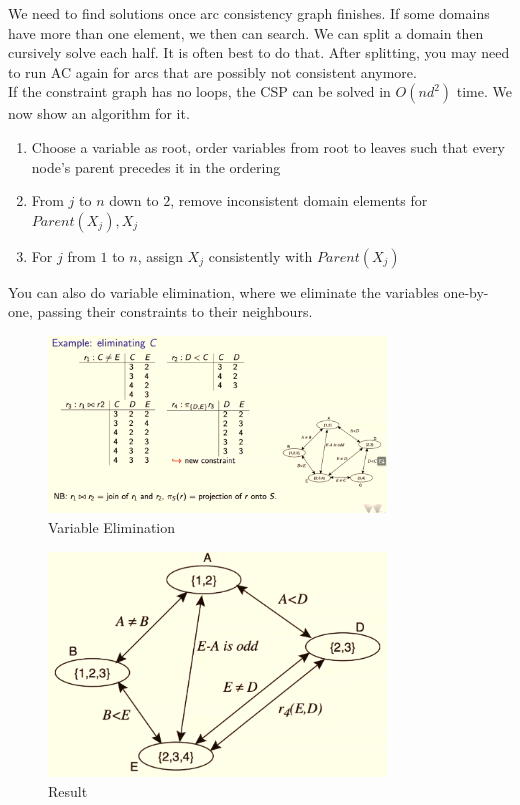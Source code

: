 \documentclass[a4paper]{article}
\theoremstyle{plain}
\theoremstyle{definition}
\theoremstyle{remark}
\begin{document}
We need to find solutions once arc consistency graph finishes. If some domains have more than one element, we then can search. We can split a domain then cursively solve each half. It is often best to do that. After splitting, you may need to run AC again for arcs that are possibly not consistent anymore. \\
If the constraint graph has no loops, the CSP can be solved in $O(nd^2)$ time. We now show an algorithm for it. \\
\begin{enumerate}
	\item Choose a variable as root, order variables from root to leaves such that every node's parent precedes it in the ordering
	\item From $j$ to $n$ down to $2$, remove inconsistent domain elements for $Parent(X_j),X_j$
	\item For  $j$ from $1$ to $n$, assign $X_j$ consistently with $Parent(X_j)$
\end{enumerate}
You can also do variable elimination, where we eliminate the variables one-by-one, passing their constraints to their neighbours.
\begin{figure}[H]
	\centering
	\includegraphics[width=0.8\textwidth]{four.png}
	\caption{Variable Elimination}
	\label{fig:four-png}
\end{figure}
\begin{figure}[H]
	\centering
	\includegraphics[width=0.8\textwidth]{five.png}
	\caption{Result}
	\label{fig:five-png}
\end{figure}
\end{document}
